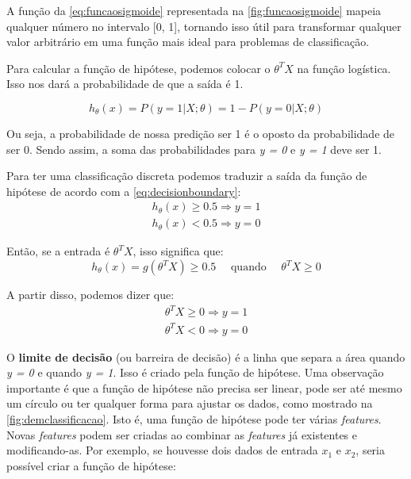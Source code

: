 A função da \autoref{eq:funcaosigmoide} representada na \autoref{fig:funcaosigmoide} mapeia qualquer número no intervalo [0, 1], tornando isso útil para transformar qualquer valor arbitrário em uma função mais ideal para problemas de classificação.

Para calcular a função de hipótese, podemos colocar o $\theta^TX$ na função logística. Isso nos dará a probabilidade de que a saída é 1.

\begin{equation}
h_{\theta}(x) = P(y=1 | X ; \theta) = 1 - P(y=0 | X ; \theta) \nonumber
\end{equation}

Ou seja, a probabilidade de nossa predição ser 1 é o oposto da probabilidade de ser 0. Sendo assim, a soma das probabilidades para \textit{y = 0} e \textit{y = 1} deve ser 1.

Para ter uma classificação discreta podemos traduzir a saída da função de hipótese de acordo com a \autoref{eq:decisionboundary}:
\begin{align} 
h_{\theta}(x) \geq 0.5 \Rightarrow y = 1 \nonumber \\
h_{\theta}(x) < 0.5 \Rightarrow y = 0 \label{eq:decisionboundary}
\end{align}

Então, se a entrada é $\theta^TX$, isso significa que:
\begin{equation}
h_{\theta}(x) = g(\theta^TX) \geq 0.5 \quad \text{ quando } \quad \theta^TX \geq 0 \nonumber
\end{equation}

A partir disso, podemos dizer que:
\begin{align}
\theta^TX \geq 0 \Rightarrow y = 1 \nonumber \\
\theta^TX < 0 \Rightarrow y = 0 \nonumber
\end{align}

O \textbf{limite de decisão} (ou barreira de decisão) é a linha que separa a área quando \textit{y = 0} e quando \textit{y = 1}. Isso é criado pela função de hipótese. Uma observação importante é que a função de hipótese não precisa ser linear, pode ser até mesmo um círculo ou ter qualquer forma para ajustar os dados, como mostrado na \autoref{fig:demclassificacao}. Isto é, uma função de hipótese pode ter várias \textit{features}. Novas \textit{features} podem ser criadas ao combinar as \textit{features} já existentes e modificando-as. Por exemplo, se houvesse dois dados de entrada $x_1$ e $x_2$, seria possível criar a função de hipótese:

